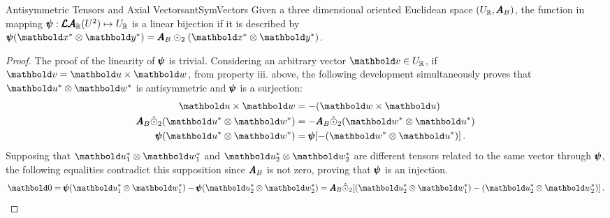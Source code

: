 \begin{mteo}{Antisymmetric Tensors and Axial Vectors}{antSymVectors}
Given a three dimensional oriented Euclidean space $(U_{\mathbb{R}},\pmb{A}_B)$, the function in mapping $\pmb{\psi} : \pmb{\mathcal{LA}}_{\mathbb{R}}(U^2) \mapsto U_{\mathbb{R}}$ is a linear bijection if it is described by $\tnr{\psi}(\vto{x}^*\otimes\vto{y}^*)=\tnr{A}_B\odot_2(\vto{x}^*\otimes\vto{y}^*)$. 
\end{mteo}
\vspace{1pt}
{\footnotesize
\begin{proof} 
The proof of the linearity of $\pmb{\psi}$ is trivial. Considering an arbitrary vector $\vto{v}\in U_\real$, if $\vto{v}=\vto{u}\times\vto{w}$, from property iii. above, the following development simultaneously proves that $\vto{u}^*\otimes\vto{w}^*$ is antisymmetric and $\pmb{\psi}$ is a surjection:
\begin{align*}
\vto{u}\times\vto{w} &= - (\vto{w}\times\vto{u}) \\
\tnr{A}_B\hat{\odot}_2(\vto{u}^*\otimes\vto{w}^*) &= -\tnr{A}_B\hat{\odot}_2(\vto{w}^*\otimes\vto{u}^*)\\
\tnr{\psi}(\vto{u}^*\otimes\vto{w}^*)&=\tnr{\psi}[-(\vto{w}^*\otimes\vto{u}^*)]\,.
\end{align*}
Supposing that $\vto{u}_1^*\otimes\vto{w}_1^*$ and $\vto{u}_2^*\otimes\vto{w}_2^*$ are different tensors related to the same vector through $\pmb{\psi}$, the following equalities contradict this supposition since $\pmb{A}_B$ is not zero, proving that $\pmb{\psi}$ is an injection.
\begin{equation*}
\vto{0}=\tnr{\psi}(\vto{u}_1^*\otimes\vto{w}_1^*)-\tnr{\psi}(\vto{u}_2^*\otimes\vto{w}_2^*)=\tnr{A}_B\hat{\odot}_2[(\vto{u}_2^*\otimes\vto{w}_1^*)-(\vto{u}_2^*\otimes\vto{w}^*_2)]\,.
\end{equation*}
\end{proof}}


